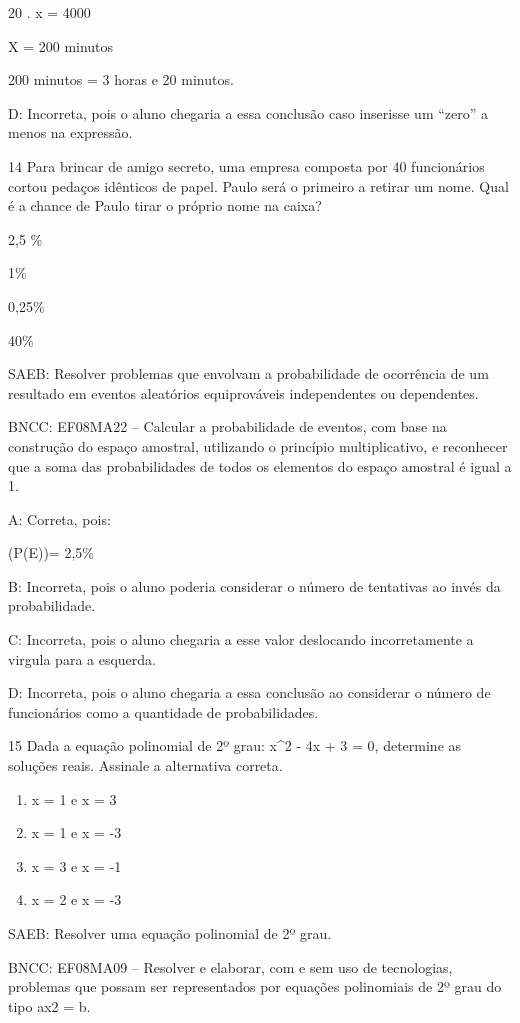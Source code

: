 {20 . x = 4000

X = 200 minutos

200 minutos = 3 horas e 20 minutos.

D: Incorreta, pois o aluno chegaria a essa conclusão caso inserisse um
``zero'' a menos na expressão.

\num{14} Para brincar de amigo secreto, uma empresa composta por 40
funcionários cortou pedaços idênticos de papel. Paulo será o primeiro a
retirar um nome. Qual é a chance de Paulo tirar o próprio nome na caixa?
\item 2,5 \%
\item 1\%
\item 0,25\%
\item 40\%

SAEB: Resolver problemas que envolvam a probabilidade de ocorrência de
um resultado em eventos aleatórios equiprováveis independentes ou
dependentes.

BNCC: EF08MA22 -- Calcular a probabilidade de eventos, com base na
construção do espaço amostral, utilizando o princípio multiplicativo, e
reconhecer que a soma das probabilidades de todos os elementos do espaço
amostral é igual a 1.

A: Correta, pois:

(P(E))= 2,5\%

B: Incorreta, pois o aluno poderia considerar o número de tentativas ao
invés da probabilidade.

C: Incorreta, pois o aluno chegaria a esse valor deslocando
incorretamente a virgula para a esquerda.

D: Incorreta, pois o aluno chegaria a essa conclusão ao considerar o
número de funcionários como a quantidade de probabilidades.

\num{15} Dada a equação polinomial de 2º grau: x^2 - 4x + 3 = 0, determine as
soluções reais. Assinale a alternativa correta.

\begin{enumerate}
\def\labelenumi{\alph{enumi})}
\item
  x = 1 e x = 3
\item
  x = 1 e x = -3
\item
  x = 3 e x = -1
\item
  x = 2 e x = -3
\end{enumerate}

SAEB: Resolver uma equação polinomial de 2º grau.

BNCC: EF08MA09 -- Resolver e elaborar, com e sem uso de tecnologias,
problemas que possam ser representados por equações polinomiais de 2º
grau do tipo ax2 = b.

}
